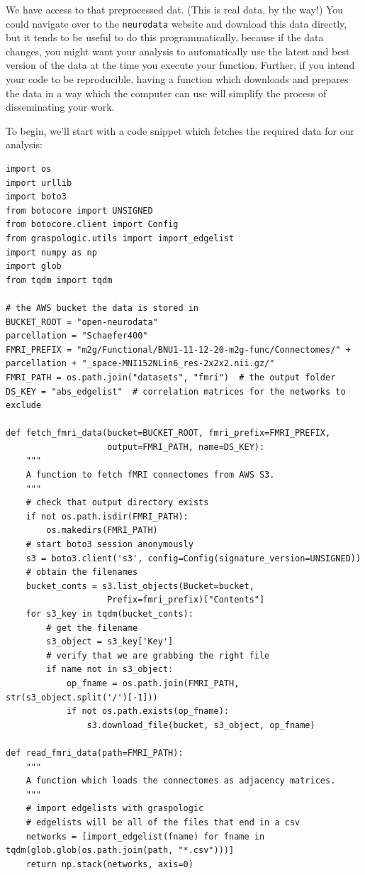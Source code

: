 We have access to that preprocessed dat. (This is real data, by the way!) You could navigate over to the \texttt{neurodata} website and download this data directly, but it tends to be useful to do this programmatically, because if the data changes, you might want your analysis to automatically use the latest and best version of the data at the time you execute your function. Further, if you intend your code to be reproducible, having a function which downloads and prepares the data in a way which the computer can use will simplify the process of disseminating your work. 

To begin, we'll start with a code snippet which fetches the required data for our analysis:

\begin{lstlisting}[style=python]
import os
import urllib
import boto3
from botocore import UNSIGNED
from botocore.client import Config
from graspologic.utils import import_edgelist
import numpy as np
import glob
from tqdm import tqdm

# the AWS bucket the data is stored in
BUCKET_ROOT = "open-neurodata"
parcellation = "Schaefer400"
FMRI_PREFIX = "m2g/Functional/BNU1-11-12-20-m2g-func/Connectomes/" + parcellation + "_space-MNI152NLin6_res-2x2x2.nii.gz/"
FMRI_PATH = os.path.join("datasets", "fmri")  # the output folder
DS_KEY = "abs_edgelist"  # correlation matrices for the networks to exclude

def fetch_fmri_data(bucket=BUCKET_ROOT, fmri_prefix=FMRI_PREFIX,
                    output=FMRI_PATH, name=DS_KEY):
    """
    A function to fetch fMRI connectomes from AWS S3.
    """
    # check that output directory exists
    if not os.path.isdir(FMRI_PATH):
        os.makedirs(FMRI_PATH)
    # start boto3 session anonymously
    s3 = boto3.client('s3', config=Config(signature_version=UNSIGNED))
    # obtain the filenames
    bucket_conts = s3.list_objects(Bucket=bucket, 
                    Prefix=fmri_prefix)["Contents"]
    for s3_key in tqdm(bucket_conts):
        # get the filename
        s3_object = s3_key['Key']
        # verify that we are grabbing the right file
        if name not in s3_object:
            op_fname = os.path.join(FMRI_PATH, str(s3_object.split('/')[-1]))
            if not os.path.exists(op_fname):
                s3.download_file(bucket, s3_object, op_fname)

def read_fmri_data(path=FMRI_PATH):
    """
    A function which loads the connectomes as adjacency matrices.
    """
    # import edgelists with graspologic
    # edgelists will be all of the files that end in a csv
    networks = [import_edgelist(fname) for fname in tqdm(glob.glob(os.path.join(path, "*.csv")))]
    return np.stack(networks, axis=0)
\end{lstlisting}

